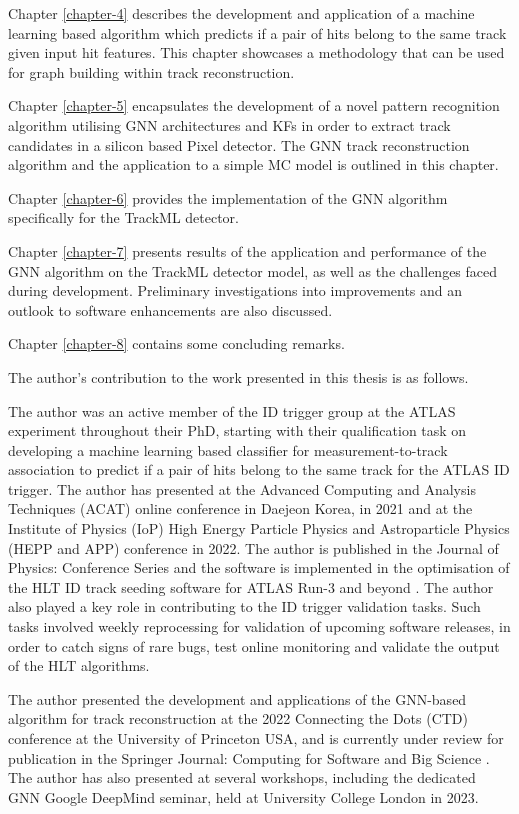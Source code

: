 Chapter \ref{chapter-4} describes the development and application of a machine learning based algorithm which predicts if a pair of hits belong to the same track given input hit features. This chapter showcases a methodology that can be used for graph building within track reconstruction.

Chapter \ref{chapter-5} encapsulates the development of a novel pattern recognition algorithm utilising \acs{GNN} architectures and \ac{KF}s in order to extract track candidates in a silicon based Pixel detector. The \acs{GNN} track reconstruction algorithm and the application to a simple \ac{MC} model is outlined in this chapter.

Chapter \ref{chapter-6} provides the implementation of the \acs{GNN} algorithm specifically for the TrackML detector.

Chapter \ref{chapter-7} presents results of the application and performance of the \acs{GNN} algorithm on the TrackML detector model, as well as the challenges faced during development. Preliminary investigations into improvements and an outlook to software enhancements are also discussed.

Chapter \ref{chapter-8} contains some concluding remarks.

The author’s contribution to the work presented in this thesis is as follows.

The author was an active member of the \ac{ID} trigger group at the ATLAS experiment throughout their PhD, starting with their qualification task on developing a machine learning based classifier for measurement-to-track association to predict if a pair of hits belong to the same track for the ATLAS ID trigger. The author has presented at the Advanced Computing and Analysis Techniques (ACAT) online conference in Daejeon Korea, in 2021 and at the Institute of Physics (IoP) High Energy Particle Physics and Astroparticle Physics (HEPP and APP) conference in 2022. The author is published in the Journal of Physics: Conference Series \cite{Lad_2023} and the software is implemented in the optimisation of the \ac{HLT} ID track seeding software for ATLAS Run-3 and beyond \cite{Grandi:2728111, Long:2813981}. The author also played a key role in contributing to the ID trigger validation tasks. Such tasks involved weekly reprocessing for validation of upcoming software releases, in order to catch signs of rare bugs, test online monitoring and validate the output of the \ac{HLT} algorithms.

The author presented the development and applications of the GNN-based algorithm for track reconstruction at the 2022 Connecting the Dots (CTD) conference at the University of Princeton USA, and is currently under review for publication in the Springer Journal: Computing for Software and Big Science \cite{Lad_2023_gnn}. The author has also presented at several workshops, including the dedicated \acs{GNN} Google DeepMind seminar, held at University College London in 2023.

